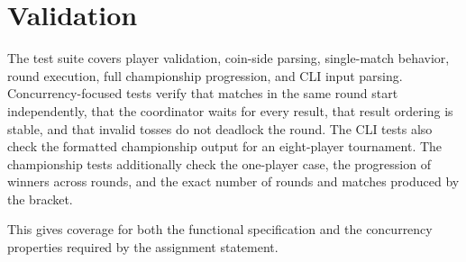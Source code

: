 \section{Validation}

The test suite covers player validation, coin-side parsing, single-match behavior, round execution, full championship
progression, and CLI input parsing.
Concurrency-focused tests verify that matches in the same round start independently, that the coordinator waits for
every result, that result ordering is stable, and that invalid tosses do not deadlock the round.
The CLI tests also check the formatted championship output for an eight-player tournament.
The championship tests additionally check the one-player case, the progression of winners across rounds, and the exact
number of rounds and matches produced by the bracket.

This gives coverage for both the functional specification and the concurrency properties required by the assignment
statement.
